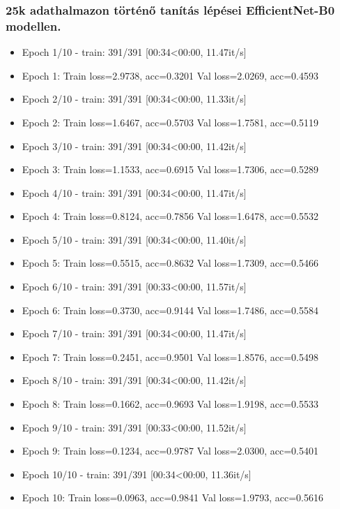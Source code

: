 \subsubsection{25k adathalmazon történő tanítás lépései EfficientNet-B0 modellen.}
  \begin{itemize} 
    \item Epoch 1/10 - train: 391/391 [00:34<00:00, 11.47it/s]
    \item Epoch 1: Train loss=2.9738, acc=0.3201 Val loss=2.0269, acc=0.4593
    \item Epoch 2/10 - train: 391/391 [00:34<00:00, 11.33it/s]
    \item Epoch 2: Train loss=1.6467, acc=0.5703 Val loss=1.7581, acc=0.5119
    \item Epoch 3/10 - train: 391/391 [00:34<00:00, 11.42it/s]
    \item Epoch 3: Train loss=1.1533, acc=0.6915 Val loss=1.7306, acc=0.5289
    \item Epoch 4/10 - train: 391/391 [00:34<00:00, 11.47it/s]
    \item Epoch 4: Train loss=0.8124, acc=0.7856 Val loss=1.6478, acc=0.5532
    \item Epoch 5/10 - train: 391/391 [00:34<00:00, 11.40it/s]
    \item Epoch 5: Train loss=0.5515, acc=0.8632 Val loss=1.7309, acc=0.5466
    \item Epoch 6/10 - train: 391/391 [00:33<00:00, 11.57it/s]
    \item Epoch 6: Train loss=0.3730, acc=0.9144 Val loss=1.7486, acc=0.5584
    \item Epoch 7/10 - train: 391/391 [00:34<00:00, 11.47it/s]
    \item Epoch 7: Train loss=0.2451, acc=0.9501 Val loss=1.8576, acc=0.5498
    \item Epoch 8/10 - train: 391/391 [00:34<00:00, 11.42it/s]
    \item Epoch 8: Train loss=0.1662, acc=0.9693 Val loss=1.9198, acc=0.5533
    \item Epoch 9/10 - train: 391/391 [00:33<00:00, 11.52it/s]
    \item Epoch 9: Train loss=0.1234, acc=0.9787 Val loss=2.0300, acc=0.5401
    \item Epoch 10/10 - train: 391/391 [00:34<00:00, 11.36it/s]
    \item Epoch 10: Train loss=0.0963, acc=0.9841 Val loss=1.9793, acc=0.5616
  \end{itemize}

